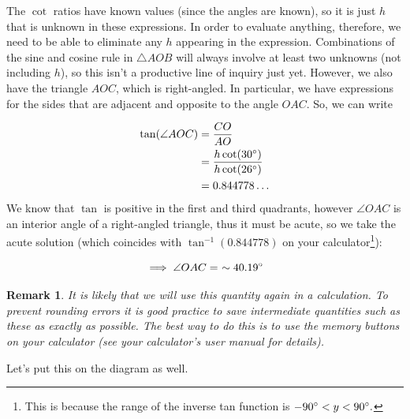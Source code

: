 \documentclass[a4paper,11pt]{article}
\newtheorem*{remark}{Remark}
\begin{document}
The $\cot$ ratios have known values (since the angles are known), so it is just $h$ that is unknown in these expressions. In order to evaluate anything, therefore, we need to be able to eliminate any $h$ appearing in the expression. Combinations of the sine and cosine rule in $\triangle AOB$ will always involve at least two unknowns (not including $h$), so this isn't a productive line of inquiry just yet. However, we also have the triangle $AOC$, which is right-angled. In particular, we have expressions for the sides that are adjacent and opposite to the angle $OAC$. So, we can write

\begin{align*}
\tan(\angle AOC) &= \frac{CO}{AO}\\
&= \frac{h\cot(30\degree)}{h\cot(26\degree)}\\
&= 0.844778\ldots
\end{align*}
We know that $\tan$ is positive in the first and third quadrants, however $\angle OAC$ is an interior angle of a right-angled triangle, thus it must be acute, so we take the acute solution (which coincides with $\tan^{-1}(0.844778)$ on your calculator\footnote{This is because the range of the inverse tan function is $-90\degree < y < 90\degree.$}):

$$
\implies \angle OAC =\ \sim 40.19\degree
$$

\begin{remark}\normalfont 
It is likely that we will use this quantity again in a calculation. To prevent rounding errors it is good practice to save intermediate quantities such as these as exactly as possible. The best way to do this is to use the memory buttons on your calculator (see your calculator's user manual for details). 
\end{remark}

\noindent Let's put this on the diagram as well.

\begin{center}
\end{center}
\end{document}
